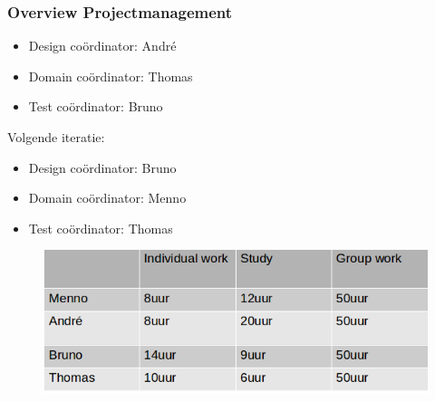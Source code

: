 \documentclass{beamer}
\begin{document}
\begin{frame}
\frametitle{Overview Projectmanagement}

\begin{itemize}
	\item Design co\"ordinator: Andr\'e
	\item Domain co\"ordinator: Thomas
	\item Test co\"ordinator: Bruno
\end{itemize}

Volgende iteratie:

\begin{itemize}
	\item Design co\"ordinator: Bruno
	\item Domain co\"ordinator: Menno
	\item Test co\"ordinator: Thomas
\end{itemize}

\begin{figure}
	\includegraphics[width=0.6\paperwidth]{figures/workHours.png}
\end{figure}

\end{frame}
\end{document}
